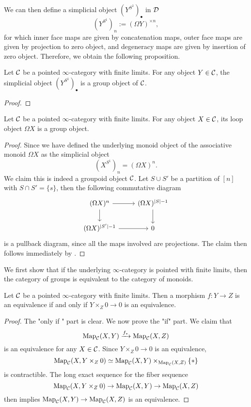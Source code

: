 We can then define a simplicial object $(Y^{S^1})_{\bullet}$ in ${\mathcal{D}}$ 
$$
(Y^{S^1})_{n}:=(\Omega Y)^{\times n},
$$ for which inner face maps are given by concatenation maps, outer face maps are given by projection to zero object, and degeneracy maps are given by insertion of zero object. Therefore, we obtain the following proposition.
\begin{proposition}
	Let ${\mathcal{C}}$ be a pointed $\infty$-category with finite limits. For any object $Y\in {\mathcal{C}}$, the simplicial object $(Y^{S^1})_{\bullet}$ is a group object of ${\mathcal{C}}$.
\end{proposition}
\begin{proof}
    
\end{proof}

\begin{lemma}
\label{loop objects are grouplike monoid objects}
	Let ${\mathcal{C}}$ be a pointed $\infty$-category with finite limits. For any object $X\in {\mathcal{C}}$, its loop object $\Omega X$ is a group object.
\end{lemma}
\begin{proof}
	Since we have defined the underlying monoid object of the associative monoid $\Omega X$ as the simplicial object
	$$
	(X^{S^1})_n=(\Omega X)^{n}.
	$$
	We claim this is indeed a groupoid object ${\mathcal{C}}$.
    Let $S\cup S'$ be a partition of $[n]$ with $S\cap S'=\{s\}$, then the following commutative diagram
    \[
\begin{tikzcd}
	(\Omega X)^{ n} & (\Omega X)^{|S|-1} \\
	(\Omega X)^{ |S'|-1}   &  0
	\arrow[from=1-1, to= 1-2]
	\arrow[from=1-1, to=2-1]
	\arrow[from=1-2, to=2-2]
	\arrow[from=2-1, to= 2-2]
\end{tikzcd}
    \]
	is a pullback diagram, since all the maps involved are projections.
	The claim then follows immediately by \cite[Remark 5.2.6.5.]{HA}.
\end{proof}


We first show that if the underlying $\infty$-category is pointed with finite limits, then the category of groups is equivalent to the category of monoids.
\begin{lemma}
    Let ${\mathcal{C}}$ be a pointed $\infty$-category with finite limits.
    Then a morphism $f:Y \to Z$ is an equivalence if and only if $Y\times_Z 0\to 0$ is an equivalence.
\end{lemma}
\begin{proof}
    The "only if " part is clear. 
    We now prove the "if" part. We claim that
    $$
    \operatorname{Map}_{{\mathcal{C}}}(X, Y)
    \xrightarrow{f_*}
    \operatorname{Map}_{{\mathcal{C}}}(X, Z)
    $$
    is an equivalence for any $X\in {\mathcal{C}}$. Since $Y\times_Z 0\to 0$ is an equivalence, 
    $$
    \operatorname{Map}_{{\mathcal{C}}}(X,Y\times_Z 0) 
    \simeq
    \operatorname{Map}_{{\mathcal{C}}}(X,Y) \times_{\operatorname{Map}_{{\mathcal{C}}}(X,Z)} \{*\} 
    $$
     is contractible. The long exact sequence for the fiber sequence 
    $$
    \operatorname{Map}_{{\mathcal{C}}}(X,Y\times_Z 0)  \to \operatorname{Map}_{{\mathcal{C}}}(X, Y ) \to \operatorname{Map}_{{\mathcal{C}}}(X, Z)
    $$
    then implies $\operatorname{Map}_{{\mathcal{C}}}(X, Y ) \to \operatorname{Map}_{{\mathcal{C}}}(X, Z)$ is an equivalence.
    
\end{proof}




